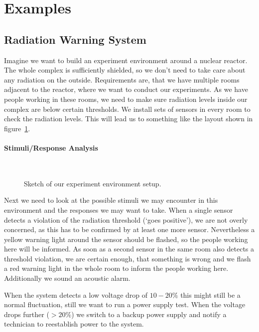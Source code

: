 \documentclass[10pt,a4paper,titlepage,draft]{article} %
\begin{document}
\section{Examples}

\subsection{Radiation Warning System}
Imagine we want to build an experiment environment around a nuclear reactor.
The whole complex is sufficiently shielded, so we don't need to take care about any radiation on the outside.
Requirements are, that we have multiple rooms adjacent to the reactor, where we want to conduct our experiments.
As we have people working in these rooms, we need to make sure radiation levels inside our complex are below certain thresholds.
We install sets of sensors in every room to check the radiation levels.
This will lead us to something like the layout shown in figure~\ref{fig:radWarner}.

\paragraph{Stimuli/Response Analysis} \ \\
\begin{figure}[htbp]
\centering

\caption{Sketch of our experiment environment setup.}
\label{fig:radWarner}
\end{figure}
Next we need to look at the possible stimuli we may encounter in this environment and the responses we may want to take.
When a single sensor detects a violation of the radiation threshold (`goes positive'), we are not overly concerned, as this has to be confirmed by at least one more sensor.
Nevertheless a yellow warning light around the sensor should be flashed, so the people working here will be informed.
As soon as a second sensor in the same room also detects a threshold violation, we are certain enough, that something is wrong and we flash a red warning light in the whole room to inform the people working here.
Additionally we sound an acoustic alarm.

When the system detects a low voltage drop of $10-20\%$ this might still be a normal fluctuation, still we want to run a power supply test.
When the voltage drops further ($>20\%$) we switch to a backup power supply and notify a technician to reestablish power to the system.
\end{document}
